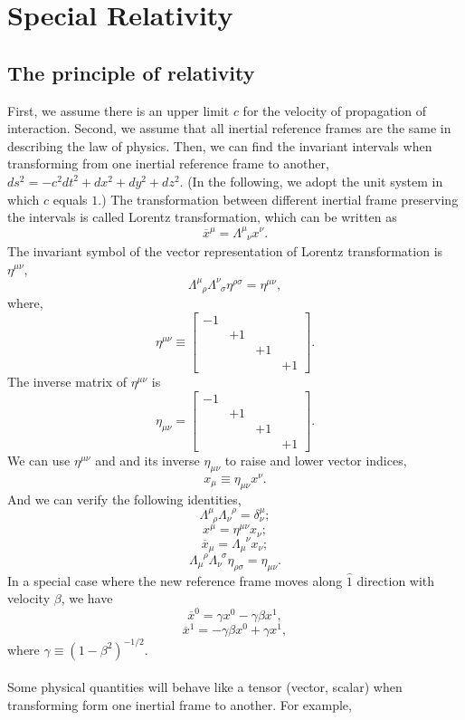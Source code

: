 \chapter{Special Relativity}
\section{The principle of relativity}
First, we assume there is an upper limit $c$ for the velocity of propagation of interaction. Second, we assume that all inertial reference frames are the same in describing the law of physics. Then, we can find the invariant intervals when transforming from one inertial reference frame to another, $ds^2 = -c^2 dt^2 + dx^2 + dy^2 + dz^2$. 
(In the following, we adopt the unit system in which $c$ equals $1$.) The transformation between different inertial frame preserving the intervals is called Lorentz transformation, which can be written as
\[\overline{x}^{\mu} = \Lambda^{\mu}_{\phantom{\mu}\nu} x^{\nu}.\]
The invariant symbol of the vector representation of Lorentz transformation is $\eta^{\mu \nu}$,
\[\Lambda^{\mu}_{\phantom{\mu}\rho}  \Lambda^{\nu}_{\phantom{\nu}\sigma}  \eta^{\rho \sigma} = \eta^{\mu \nu},\]
where,
\[\eta^{\mu \nu} \equiv \left[ 
\begin{matrix} 
-1& & & \\ 
& +1 & & \\
& & +1 & \\
& & & +1
\end{matrix} 
\right].\]
The inverse matrix of $\eta^{\mu \nu}$ is
\[\eta_{\mu \nu} = \left[ 
\begin{matrix} 
-1& & & \\ 
& +1 & & \\
& & +1 & \\
& & & +1
\end{matrix} 
\right].\]
We can use $\eta^{\mu \nu}$ and and its inverse $\eta_{\mu \nu}$ to raise and lower vector indices, 
\[x_{\mu} \equiv \eta_{\mu \nu} x^{\nu}.\]
And we can verify the following identities,
\[\Lambda^{\mu}_{\phantom{\rho}\rho} \Lambda_{\nu}^{\phantom{\rho}\rho} = \delta^{\mu}_{\nu};\]
\[x^{\mu} = \eta^{\mu \nu} x_{\nu};\]
\[\overline{x}_{\mu} = \Lambda_{\mu}^{\phantom{\mu}\nu} x_{\nu};\]
\[\Lambda_{\mu}^{\phantom{\mu}\rho} \Lambda_{\nu} ^{\phantom{\nu}\sigma}  \eta_{\rho \sigma} = \eta_{\mu \nu}.\]
In a special case where the new reference frame moves along $\hat{1}$ direction with velocity $\beta$, we have
\[\overline{x}^{0} = \gamma x^0 - \gamma \beta x^1,\]
\[\overline{x}^{1} = -\gamma \beta x^0 + \gamma x^1,\]
where $\gamma \equiv (1-\beta^2)^{-1/2}$.
\\ \\
Some physical quantities will behave like a tensor (vector, scalar) when transforming form one inertial frame to another. For example,
